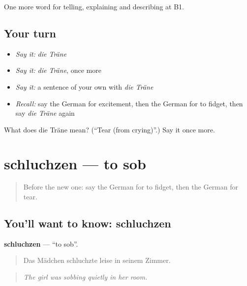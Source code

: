\begin{grammarlens}[title={What you've built}]
One more word for telling, explaining and describing at B1.
\end{grammarlens}

\subsection*{Your turn}
\begin{itemize}
\raggedright
  \item \emph{Say it:} \emph{die Träne}
  \item \emph{Say it:} \emph{die Träne}, once more
  \item \emph{Say it:} a sentence of your own with \emph{die Träne}
  \item \emph{Recall:} say the German for excitement, then the German for to fidget, then say \emph{die Träne} again
\end{itemize}

\begin{tcolorbox}[breakable,colback=teal!4,colframe=teal!35!black,title={Before you move on}]
What does die Träne mean? (\textquotedblleft{}Tear (from crying)\textquotedblright{}.) Say it once more.
\end{tcolorbox}
\section[schluchzen]{schluchzen — to sob}

\label{lesson:GE-C471-schluchzen}



\begin{quote}
Before the new one: say the German for to fidget, then the German for tear.
\end{quote}

\subsection*{You'll want to know: schluchzen}
\textbf{schluchzen} — \textquotedblleft{}to sob\textquotedblright{}.

\begin{quote}
Das Mädchen schluchzte leise in seinem Zimmer.
\end{quote}

\begin{quote}
\emph{The girl was sobbing quietly in her room.}
\end{quote}

